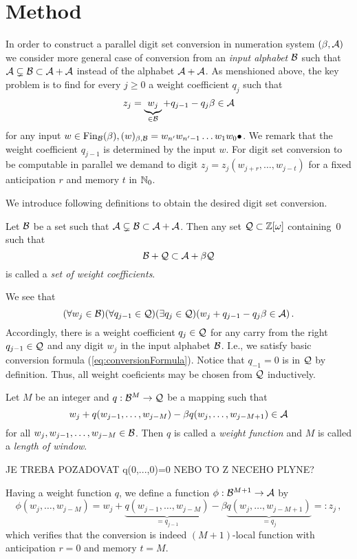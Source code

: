 \section{Method}
In order to construct a parallel digit set conversion in numeration system $(\beta,\mathcal{A})$ we consider more general case of conversion from an \emph{input alphabet} $\mathcal{B}$ such that $\mathcal{A} \subsetneq \mathcal{B} \subset \mathcal{A} +\mathcal{A}$ instead of the alphabet $\mathcal{A}+\mathcal{A}$.
As menshioned above, the key problem is to find for every $j\geq 0$ a weight coefficient $q_j$ such that 
    $$
        z_j=\underbrace{w_j}_{\in \mathcal{B}} + q_{j-1} - q_j \beta \in \mathcal{A} 
    $$  
    for any input $w\in \text{Fin}_{\mathcal{B}}(\beta), (w)_{\beta,\mathcal{B}}=w_{n'}w_{n'-1}\dots w_1 w_0 \bullet$. We remark that the weight coefficient $q_{j-1}$ is determined by the input $w$. For digit set conversion to be computable in parallel we demand to digit $z_j=z_j(w_{j+r},\dots,w_{j-t})$ for a fixed anticipation $r$ and memory $t$ in $\mathbb{N}_0$.
    
    We introduce following definitions to obtain the desired digit set conversion. 
    \begin{defn}
        Let $\mathcal{B}$ be a set such that $\mathcal{A} \subsetneq \mathcal{B} \subset \mathcal{A} +\mathcal{A}$. Then any set $\mathcal{Q}\subset\mathbb{Z}[\omega]$ containing~0 such that 
        $$
            \mathcal{B} + \mathcal{Q} \subset \mathcal{A} + \beta \mathcal{Q}
        $$  
        is called a \emph{set of weight coefficients}.
    \end{defn}
    We see that
        $$
        (\forall w_j \in \mathcal{B})(\forall q_{j-1}\in\mathcal{Q})(\exists q_j \in \mathcal{Q} )(w_j + q_{j-1} - q_j \beta \in \mathcal{A} )\,.
        $$
    Accordingly, there is a weight coefficient $q_j \in \mathcal{Q}$ for any carry from the right $q_{j-1}\in \mathcal{Q}$ and any digit $w_j$ in the input alphabet $\mathcal{B}$. I.e., we  satisfy basic conversion formula (\ref{eq:conversionFormula}). Notice that $q_{-1}=0$ is in $\mathcal{Q}$ by definition. Thus, all weight coeficients may be chosen from $\mathcal{Q}$ inductively.
    \begin{defn}
    Let $M$ be an integer and $q:\mathcal{B}^{M} \rightarrow \mathcal{Q}$ be a mapping such that 
    $$
    w_j+ q(w_{j-1}, \dots, w_{j-M}) - \beta q(w_j, \dots, w_{j-M+1}) \in \mathcal{A}
    $$
    for all $w_j,w_{j-1}, \dots, w_{j-M} \in \mathcal{B}$. Then $q$ is called a \emph{weight function} and $M$ is called a \emph{length of window}.    
    \end{defn}
 
 JE TREBA POZADOVAT q(0,...,0)=0 NEBO TO Z NECEHO PLYNE?

 Having a weight function $q$, we define a function $\phi:\mathcal{B}^{M+1}\rightarrow \mathcal{A}$ by
    $$
        \phi(w_{j}, \dots, w_{j-M})=w_j+ \underbrace{q(w_{j-1}, \dots, w_{j-M})}_{=q_{j-1}} - \beta \underbrace{q(w_j, \dots, w_{j-M+1})}_{=q_j}=:z_j\,,
    $$ 
    which verifies that the conversion is indeed $(M+1)$-local function with anticipation $r=0$ and memory $t=M$.
    
